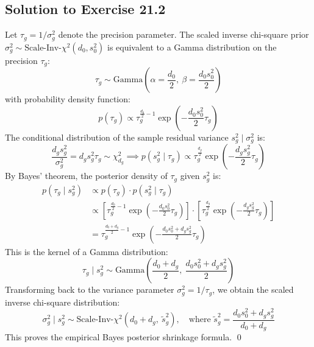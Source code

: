 \documentclass[11pt,twoside,openright]{book}
\begin{document}
\subsection*{Solution to Exercise 21.2}
Let $\tau_g = 1/\sigma_g^2$ denote the precision parameter. The scaled inverse chi-square prior $\sigma_g^2 \sim \text{Scale-Inv-}\chi^2(d_0, s_0^2)$ is equivalent to a Gamma distribution on the precision $\tau_g$:
$$\tau_g \sim \text{Gamma}\left(\alpha = \frac{d_0}{2}, \ \beta = \frac{d_0 s_0^2}{2}\right)$$
with probability density function:
$$p(\tau_g) \propto \tau_g^{\frac{d_0}{2} - 1} \exp\left(-\frac{d_0 s_0^2}{2} \tau_g\right)$$
The conditional distribution of the sample residual variance $s_g^2 \mid \sigma_g^2$ is:
$$\frac{d_g s_g^2}{\sigma_g^2} = d_g s_g^2 \tau_g \sim \chi^2_{d_g} \implies p(s_g^2 \mid \tau_g) \propto \tau_g^{\frac{d_g}{2}} \exp\left(-\frac{d_g s_g^2}{2} \tau_g\right)$$
By Bayes' theorem, the posterior density of $\tau_g$ given $s_g^2$ is:
\begin{align*}
p(\tau_g \mid s_g^2) &\propto p(\tau_g) \cdot p(s_g^2 \mid \tau_g) \\
&\propto \left[ \tau_g^{\frac{d_0}{2} - 1} \exp\left(-\frac{d_0 s_0^2}{2} \tau_g\right) \right] \cdot \left[ \tau_g^{\frac{d_g}{2}} \exp\left(-\frac{d_g s_g^2}{2} \tau_g\right) \right] \\
&= \tau_g^{\frac{d_0 + d_g}{2} - 1} \exp\left( -\frac{d_0 s_0^2 + d_g s_g^2}{2} \tau_g \right)
\end{align*}
This is the kernel of a Gamma distribution:
$$\tau_g \mid s_g^2 \sim \text{Gamma}\left( \frac{d_0 + d_g}{2}, \ \frac{d_0 s_0^2 + d_g s_g^2}{2} \right)$$
Transforming back to the variance parameter $\sigma_g^2 = 1/\tau_g$, we obtain the scaled inverse chi-square distribution:
$$\sigma_g^2 \mid s_g^2 \sim \text{Scale-Inv-}\chi^2(d_0 + d_g, \ \tilde{s}_g^2), \quad \text{where } \tilde{s}_g^2 = \frac{d_0 s_0^2 + d_g s_g^2}{d_0 + d_g}$$
This proves the empirical Bayes posterior shrinkage formula. \qed
\end{document}
